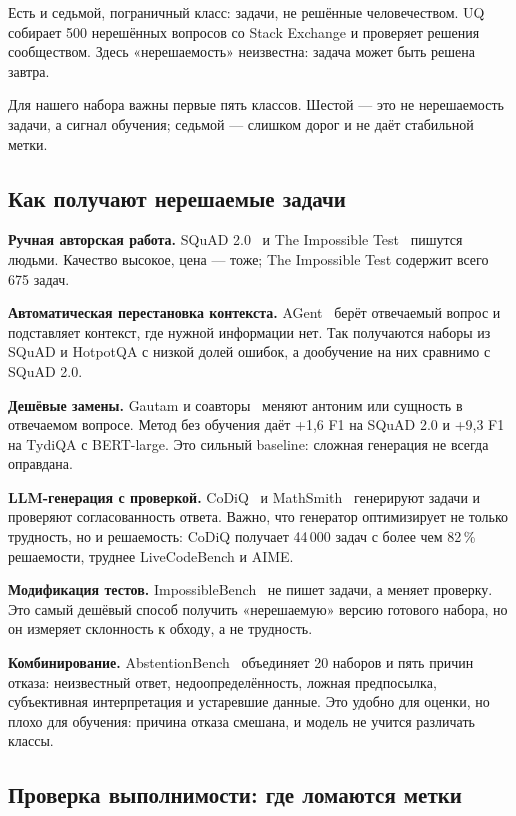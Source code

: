 \documentclass[11pt,a4paper]{article}
\begin{document}
Есть и седьмой, пограничный класс: задачи, не решённые человечеством.
UQ~\cite{uq2025} собирает 500 нерешённых вопросов со Stack Exchange и
проверяет решения сообществом. Здесь «нерешаемость» неизвестна: задача
может быть решена завтра.

Для нашего набора важны первые пять классов. Шестой — это не нерешаемость
задачи, а сигнал обучения; седьмой — слишком дорог и не даёт стабильной
метки.

\subsection{Как получают нерешаемые задачи}

\textbf{Ручная авторская работа.} SQuAD 2.0~\cite{squad2_2018} и The
Impossible Test~\cite{impossible_test2024} пишутся людьми. Качество высокое,
цена — тоже; The Impossible Test содержит всего 675 задач.

\textbf{Автоматическая перестановка контекста.} AGent~\cite{agent_unanswerable2023}
берёт отвечаемый вопрос и подставляет контекст, где нужной информации нет.
Так получаются наборы из SQuAD и HotpotQA с низкой долей ошибок, а
дообучение на них сравнимо с SQuAD 2.0.

\textbf{Дешёвые замены.} Gautam и соавторы~\cite{lightweight_unanswerable2023}
меняют антоним или сущность в отвечаемом вопросе. Метод без обучения даёт
+1,6 F1 на SQuAD 2.0 и +9,3 F1 на TydiQA с BERT-large. Это сильный baseline:
сложная генерация не всегда оправдана.

\textbf{LLM-генерация с проверкой.} CoDiQ~\cite{codiq2026} и MathSmith~\cite{mathsmith2025}
генерируют задачи и проверяют согласованность ответа. Важно, что
генератор оптимизирует не только трудность, но и решаемость: CoDiQ получает
44\,000 задач с более чем 82\,\% решаемости, труднее LiveCodeBench и AIME.

\textbf{Модификация тестов.} ImpossibleBench~\cite{impossiblebench2025}
не пишет задачи, а меняет проверку. Это самый дешёвый способ получить
«нерешаемую» версию готового набора, но он измеряет склонность к обходу,
а не трудность.

\textbf{Комбинирование.} AbstentionBench~\cite{abstentionbench2025}
объединяет 20 наборов и пять причин отказа: неизвестный ответ,
недоопределённость, ложная предпосылка, субъективная интерпретация и устаревшие
данные. Это удобно для
оценки, но плохо для обучения: причина отказа смешана, и модель не учится
различать классы.

\subsection{Проверка выполнимости: где ломаются метки}
\end{document}
